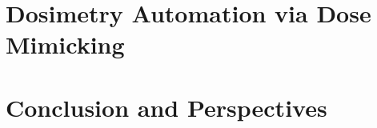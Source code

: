 \documentclass[a4paper,12pt]{book}
\begin{document}
	\chapter{Dosimetry Automation via Dose Mimicking}
	\begin{chapterabstract}
		
	\end{chapterabstract}
	\clearpage
	\localtableofcontents
	
	
	\chapter{Conclusion and Perspectives}
	\begin{chapterabstract}
		
	\end{chapterabstract}
	\clearpage
	
	
	
	
	
\end{document}

